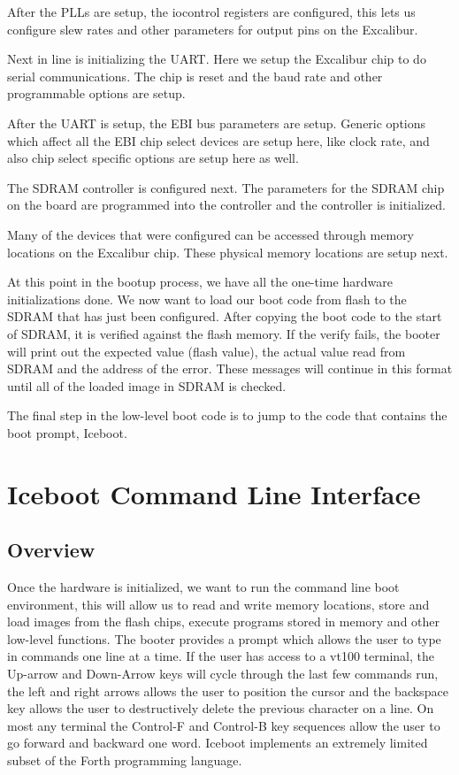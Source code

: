 \documentclass{article}
\begin{document}
After the PLLs are setup, the iocontrol registers are
configured, this lets us configure slew rates and other
parameters for output pins on the Excalibur.

Next in line is initializing the UART.  Here we setup
the Excalibur chip to do serial communications.  The
chip is reset and the baud rate and other programmable
options are setup.

After the UART is setup, the EBI bus parameters
are setup.  Generic options which affect all the
EBI chip select devices are setup here, like
clock rate, and also chip select specific options
are setup here as well.

The SDRAM controller is configured next.  The
parameters for the SDRAM chip on the board are
programmed into the controller and the controller
is initialized.

Many of the devices that were configured can be
accessed through memory locations on the Excalibur
chip.  These physical memory locations are setup 
next.

 At this point in 
the bootup process, we have all
the one-time hardware initializations done.  We
now want to load our boot code from flash to the
SDRAM that has just been configured.  After copying
the boot code to the start of SDRAM, it is verified
against the flash memory.  If the verify fails, the
booter will print out the expected value (flash value), 
the actual value read from SDRAM and the address of
the error.  These messages will continue in this format
until all of the loaded image in SDRAM is checked.

The final step in the low-level boot code is to
jump to the code that contains the boot prompt,
Iceboot.

\section{Iceboot Command Line Interface}
        \subsection{Overview}

Once the hardware is initialized, we want to run
the command line boot environment, this will allow us 
to read and write memory locations, store and load
images from the flash chips, execute programs stored
in memory and other low-level functions.  The booter
provides a prompt which allows the user to 
type in commands one line at a time.  If the user
has access to a vt100 terminal, the Up-arrow and
Down-Arrow keys will cycle through the last few
commands run, the left and right arrows allows
the user to position the cursor and the backspace
key allows the user to destructively delete the
previous character on a line.  On most any terminal 
the Control-F and Control-B key sequences allow 
the user to go forward and backward one word.
Iceboot implements an extremely limited subset
of the Forth programming language.
\end{document}
